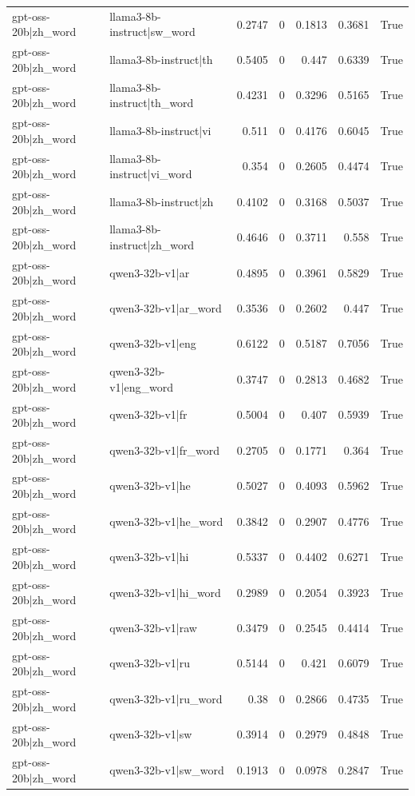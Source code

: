 \begin{table}
\begin{tabular}{l l r r r r l}
gpt-oss-20b|zh_word & llama3-8b-instruct|sw_word & 0.2747 & 0 & 0.1813 & 0.3681 & True \\
gpt-oss-20b|zh_word & llama3-8b-instruct|th & 0.5405 & 0 & 0.447 & 0.6339 & True \\
gpt-oss-20b|zh_word & llama3-8b-instruct|th_word & 0.4231 & 0 & 0.3296 & 0.5165 & True \\
gpt-oss-20b|zh_word & llama3-8b-instruct|vi & 0.511 & 0 & 0.4176 & 0.6045 & True \\
gpt-oss-20b|zh_word & llama3-8b-instruct|vi_word & 0.354 & 0 & 0.2605 & 0.4474 & True \\
gpt-oss-20b|zh_word & llama3-8b-instruct|zh & 0.4102 & 0 & 0.3168 & 0.5037 & True \\
gpt-oss-20b|zh_word & llama3-8b-instruct|zh_word & 0.4646 & 0 & 0.3711 & 0.558 & True \\
gpt-oss-20b|zh_word & qwen3-32b-v1|ar & 0.4895 & 0 & 0.3961 & 0.5829 & True \\
gpt-oss-20b|zh_word & qwen3-32b-v1|ar_word & 0.3536 & 0 & 0.2602 & 0.447 & True \\
gpt-oss-20b|zh_word & qwen3-32b-v1|eng & 0.6122 & 0 & 0.5187 & 0.7056 & True \\
gpt-oss-20b|zh_word & qwen3-32b-v1|eng_word & 0.3747 & 0 & 0.2813 & 0.4682 & True \\
gpt-oss-20b|zh_word & qwen3-32b-v1|fr & 0.5004 & 0 & 0.407 & 0.5939 & True \\
gpt-oss-20b|zh_word & qwen3-32b-v1|fr_word & 0.2705 & 0 & 0.1771 & 0.364 & True \\
gpt-oss-20b|zh_word & qwen3-32b-v1|he & 0.5027 & 0 & 0.4093 & 0.5962 & True \\
gpt-oss-20b|zh_word & qwen3-32b-v1|he_word & 0.3842 & 0 & 0.2907 & 0.4776 & True \\
gpt-oss-20b|zh_word & qwen3-32b-v1|hi & 0.5337 & 0 & 0.4402 & 0.6271 & True \\
gpt-oss-20b|zh_word & qwen3-32b-v1|hi_word & 0.2989 & 0 & 0.2054 & 0.3923 & True \\
gpt-oss-20b|zh_word & qwen3-32b-v1|raw & 0.3479 & 0 & 0.2545 & 0.4414 & True \\
gpt-oss-20b|zh_word & qwen3-32b-v1|ru & 0.5144 & 0 & 0.421 & 0.6079 & True \\
gpt-oss-20b|zh_word & qwen3-32b-v1|ru_word & 0.38 & 0 & 0.2866 & 0.4735 & True \\
gpt-oss-20b|zh_word & qwen3-32b-v1|sw & 0.3914 & 0 & 0.2979 & 0.4848 & True \\
gpt-oss-20b|zh_word & qwen3-32b-v1|sw_word & 0.1913 & 0 & 0.0978 & 0.2847 & True \\

\end{tabular}
\end{table}
